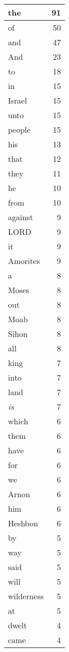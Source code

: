 \begin{center}
\begin{longtable}{l|r}
\hline \hline
\endlastfoot
the & 91 \\ \hline
of & 50 \\ \hline
and & 47 \\ \hline
And & 23 \\ \hline
to & 18 \\ \hline
in & 15 \\ \hline
Israel & 15 \\ \hline
unto & 15 \\ \hline
people & 15 \\ \hline
his & 13 \\ \hline
that & 12 \\ \hline
they & 11 \\ \hline
he & 10 \\ \hline
from & 10 \\ \hline
against & 9 \\ \hline
LORD & 9 \\ \hline
it & 9 \\ \hline
Amorites & 9 \\ \hline
a & 8 \\ \hline
Moses & 8 \\ \hline
out & 8 \\ \hline
Moab & 8 \\ \hline
Sihon & 8 \\ \hline
all & 8 \\ \hline
king & 7 \\ \hline
into & 7 \\ \hline
land & 7 \\ \hline
\emph{is} & 7 \\ \hline
which & 6 \\ \hline
them & 6 \\ \hline
have & 6 \\ \hline
for & 6 \\ \hline
we & 6 \\ \hline
Arnon & 6 \\ \hline
him & 6 \\ \hline
Heshbon & 6 \\ \hline
by & 5 \\ \hline
way & 5 \\ \hline
said & 5 \\ \hline
will & 5 \\ \hline
wilderness & 5 \\ \hline
at & 5 \\ \hline
dwelt & 4 \\ \hline
came & 4 \\ \hline

\end{longtable}
\end{center}
